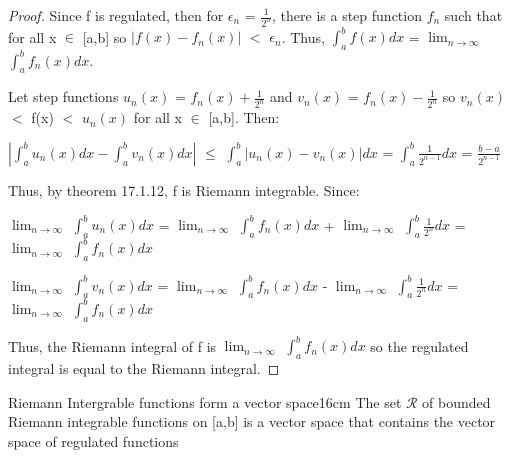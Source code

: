     \begin{proof}
        Since f is regulated, then for $\epsilon_n$ = $\frac{1}{2^n}$, there is
        a step function $f_n$ such that for all x $\in$ [a,b] so
        $|f(x) - f_n(x)|$ $<$ $\epsilon_n$.
        Thus, $\int_a^b f(x) dx$
        = $\lim_{n \rightarrow \infty}$ $\int_a^b f_n(x) dx$.

        Let step functions $u_n(x)$ = $f_n(x) + \frac{1}{2^n}$
        and $v_n(x)$ = $f_n(x) - \frac{1}{2^n}$
        so $v_n(x)$ $<$ f(x) $<$ $u_n(x)$ for all x $\in$ [a,b].
        Then:

        \hspace{0.5cm}
        $|\int_a^b u_n(x) dx - \int_a^b v_n(x) dx|$
        $\leq$ $\int_a^b |u_n(x) - v_n(x)| dx$
        = $\int_a^b \frac{1}{2^{n-1}} dx$
        = $\frac{b-a}{2^{n-1}}$

        Thus, by {\color{red} theorem 17.1.12}, f is Riemann integrable. Since:

        \hspace{0.5cm}
        $\lim_{n \rightarrow \infty}$ $\int_a^b u_n(x) dx$
        = $\lim_{n \rightarrow \infty}$ $\int_a^b f_n(x) dx$
            + $\lim_{n \rightarrow \infty}$ $\int_a^b \frac{1}{2^n} dx$
        = $\lim_{n \rightarrow \infty}$ $\int_a^b f_n(x) dx$

        \hspace{0.5cm}
        $\lim_{n \rightarrow \infty}$ $\int_a^b v_n(x) dx$
        = $\lim_{n \rightarrow \infty}$ $\int_a^b f_n(x) dx$
            - $\lim_{n \rightarrow \infty}$ $\int_a^b \frac{1}{2^n} dx$
        = $\lim_{n \rightarrow \infty}$ $\int_a^b f_n(x) dx$

        Thus, the Riemann integral of f is
        $\lim_{n \rightarrow \infty}$ $\int_a^b f_n(x) dx$
        so the regulated integral is equal to the Riemann integral.
    \end{proof}

    \vspace{0.5cm}



    \begin{wtheorem}{Riemann Intergrable functions form a vector space}{16cm}
        The set $\mathcal{R}$ of bounded Riemann integrable functions on [a,b] is
        a vector space that contains the vector space of regulated
        functions 
    \end{wtheorem}

